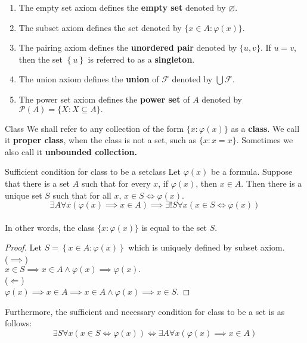 \begin{remarks}
  \begin{enumerate}
    \item The empty set axiom defines the \textbf{empty set} denoted
      by $\varnothing$.
    \item The subset axiom defines the set denoted by $\{x \in A:\varphi(x)\}$.
    \item The pairing axiom defines the \textbf{unordered pair}
      denoted by $\{u, v\}$. If $u = v$, then the set
      $\left\{u\right\}$ is referred to as a \textbf{singleton}.
    \item The union axiom defines the \textbf{union} of $\mathcal{F}$
      denoted by $\bigcup \mathcal{F}$.
    \item The power set axiom defines the \textbf{power set} of $A$
      denoted by $\mathcal{P}(A) = \{X:X \subseteq A\}.$
  \end{enumerate}
\end{remarks}

\begin{definition}{Class}{}
  We shall refer to any collection of the form $\{x:\varphi(x)\}$ as
  a \textbf{class}. We call it \textbf{proper class},
  when the class is not a set, such as $\{x:x=x\}$. Sometimes we also
  call it \textbf{unbounded collection.}
\end{definition}

\begin{theorem}{Sufficient condition for class to be a set}{class}
  Let $\varphi(x)$ be a formula. Suppose that there is a set $A$ such
  that for every $x$, if $\varphi(x)$, then $x \in A$. Then there is
  a unique set $S$ such that for all $x$, $x \in S \iff \varphi(x)$.\\
  \begin{equation*}
    \exists A \forall x (\varphi(x) \implies x \in A) \implies
    \exists ! S \forall x(x \in S \iff \varphi(x))
  \end{equation*}
  \\
  In other words, the class $\{x:\varphi(x)\}$ is equal to the set $S$.
\end{theorem}

\begin{proof}
  Let $S = \left\{x \in A \colon \varphi(x) \right\}$ which is
  uniquely defined by subset axiom.\\
  ($ \implies $)\\
  $x \in S \implies x \in A \land \varphi(x) \implies \varphi(x).$\\
  ($ \Leftarrow $)\\
  $\varphi(x) \implies x \in A \implies x \in A \land \varphi(x)
  \implies x \in S.$
\end{proof}
\begin{remarks}
  Furthermore, the sufficient and necessary condition for class to be
  a set is as follows:
  \begin{equation*}
    \exists S \forall x(x \in S \iff \varphi(x)) \iff \exists A
    \forall x(\varphi(x) \implies x \in A)
  \end{equation*}
\end{remarks}

